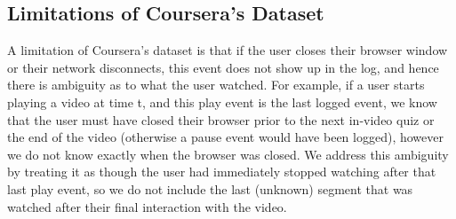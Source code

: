\documentclass{sigchi}
\begin{document}
\subsection{Limitations of Coursera's Dataset}

A limitation of Coursera's dataset is that if the user closes their browser window or their network disconnects, this event does not show up in the log, and hence there is ambiguity as to what the user watched. For example, if a user starts playing a video at time t, and this play event is the last logged event, we know that the user must have closed their browser prior to the next in-video quiz or the end of the video (otherwise a pause event would have been logged), however we do not know exactly when the browser was closed. We address this ambiguity by treating it as though the user had immediately stopped watching after that last play event, so we do not include the last (unknown) segment that was watched after their final interaction with the video. %





\end{document}

